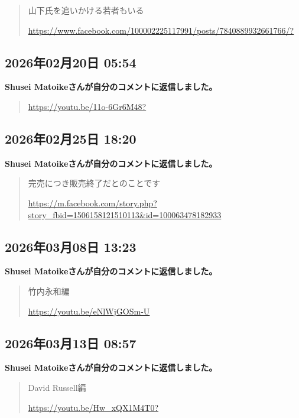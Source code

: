 \begin{quote}
山下氏を追いかける若者もいる

\url{https://www.facebook.com/100002225117991/posts/7840889932661766/?}
\end{quote}

\subsection*{2026年02月20日 05:54}

\textbf{Shusei Matoikeさんが自分のコメントに返信しました。}

\begin{quote}
\url{https://youtu.be/11o-6Gr6M48?}
\end{quote}

\subsection*{2026年02月25日 18:20}

\textbf{Shusei Matoikeさんが自分のコメントに返信しました。}

\begin{quote}
完売につき販売終了だとのことです

\url{https://m.facebook.com/story.php?story_fbid=1506158121510113&id=100063478182933}
\end{quote}

\subsection*{2026年03月08日 13:23}

\textbf{Shusei Matoikeさんが自分のコメントに返信しました。}

\begin{quote}
竹内永和編

\url{https://youtu.be/eNlWjGOSm-U}
\end{quote}

\subsection*{2026年03月13日 08:57}

\textbf{Shusei Matoikeさんが自分のコメントに返信しました。}

\begin{quote}
David Russell編

\url{https://youtu.be/Hw_xQX1M4T0?}
\end{quote}

